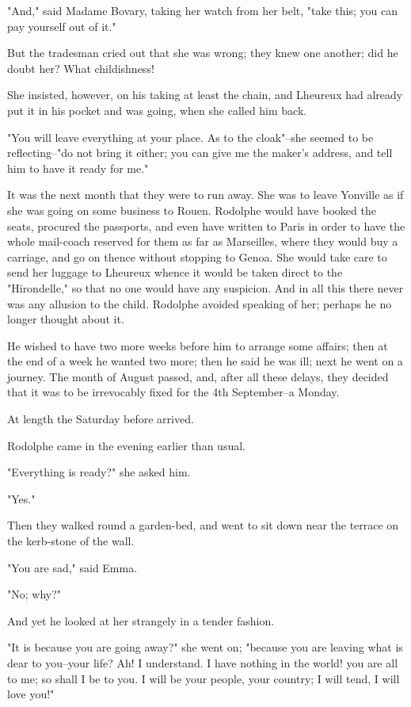 \documentclass{tufte-book}
\begin{document}
"And," said Madame Bovary, taking her watch from her belt, "take this;
you can pay yourself out of it."

But the tradesman cried out that she was wrong; they knew one another;
did he doubt her? What childishness!

She insisted, however, on his taking at least the chain, and Lheureux
had already put it in his pocket and was going, when she called him
back.

"You will leave everything at your place. As to the cloak"--she seemed
to be reflecting--"do not bring it either; you can give me the maker's
address, and tell him to have it ready for me."

It was the next month that they were to run away. She was to leave
Yonville as if she was going on some business to Rouen. Rodolphe would
have booked the seats, procured the passports, and even have written to
Paris in order to have the whole mail-coach reserved for them as far as
Marseilles, where they would buy a carriage, and go on thence without
stopping to Genoa. She would take care to send her luggage to Lheureux
whence it would be taken direct to the "Hirondelle," so that no one
would have any suspicion. And in all this there never was any allusion
to the child. Rodolphe avoided speaking of her; perhaps he no longer
thought about it.

He wished to have two more weeks before him to arrange some affairs;
then at the end of a week he wanted two more; then he said he was ill;
next he went on a journey. The month of August passed, and, after all
these delays, they decided that it was to be irrevocably fixed for the
4th September--a Monday.

At length the Saturday before arrived.

Rodolphe came in the evening earlier than usual.

"Everything is ready?" she asked him.

"Yes."

Then they walked round a garden-bed, and went to sit down near the
terrace on the kerb-stone of the wall.

"You are sad," said Emma.

"No; why?"

And yet he looked at her strangely in a tender fashion.

"It is because you are going away?" she went on; "because you are
leaving what is dear to you--your life? Ah! I understand. I have nothing
in the world! you are all to me; so shall I be to you. I will be your
people, your country; I will tend, I will love you!"
\end{document}
